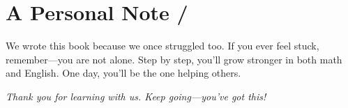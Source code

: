 \blockquote{}

\section*{A Personal Note / }

We wrote this book because we once struggled too.  
If you ever feel stuck, remember—you are not alone.  
Step by step, you'll grow stronger in both math and English.  
One day, you'll be the one helping others.  

\blockquote{}

\vspace{1cm}
\begin{center}
\textit{Thank you for learning with us. Keep going—you've got this!}  
\end{center}

